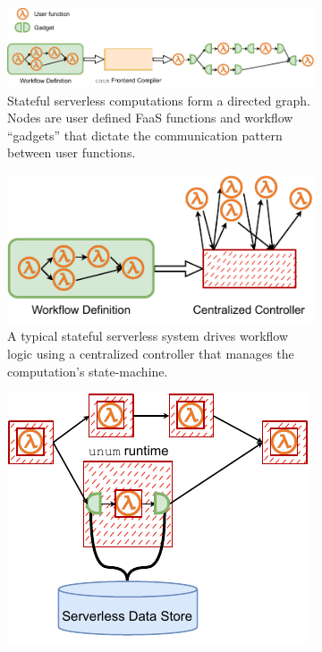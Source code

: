\begin{figure}[t]
    \centering
    \begin{subfigure}[t]{0.8\textwidth}
        \includegraphics[width=\columnwidth]{figures/unum-arch-compile-time.pdf}
        \caption{Stateful serverless computations form a directed graph. Nodes
                are user defined FaaS functions and workflow ``gadgets'' that dictate the
                communication pattern between user functions.}
        \label{fig:arch:unum-compile-time}
    \end{subfigure}
    \begin{subfigure}[b]{\columnwidth}
    \centering
        \includegraphics[width=0.8\columnwidth]{figures/unum-arch-centralized.pdf}
        \caption{A typical stateful serverless system drives workflow logic
                 using a centralized controller that manages the computation's state-machine.}
        \label{fig:arch:centralized}
    \end{subfigure}
    \hfill
    \begin{subfigure}[b]{\columnwidth}
    \centering
        \includegraphics[width=0.5\columnwidth]{figures/unum-arch-runtime.pdf}

\end{subfigure}
\end{figure}
